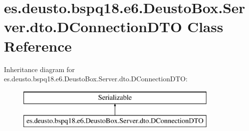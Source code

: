 \hypertarget{classes_1_1deusto_1_1bspq18_1_1e6_1_1_deusto_box_1_1_server_1_1dto_1_1_d_connection_d_t_o}{}\section{es.\+deusto.\+bspq18.\+e6.\+Deusto\+Box.\+Server.\+dto.\+D\+Connection\+D\+TO Class Reference}
\label{classes_1_1deusto_1_1bspq18_1_1e6_1_1_deusto_box_1_1_server_1_1dto_1_1_d_connection_d_t_o}
Inheritance diagram for es.\+deusto.\+bspq18.\+e6.\+Deusto\+Box.\+Server.\+dto.\+D\+Connection\+D\+TO\+:\begin{figure}[H]
\begin{center}
\leavevmode
\includegraphics[height=2.000000cm]{classes_1_1deusto_1_1bspq18_1_1e6_1_1_deusto_box_1_1_server_1_1dto_1_1_d_connection_d_t_o}
\end{center}
\end{figure}

